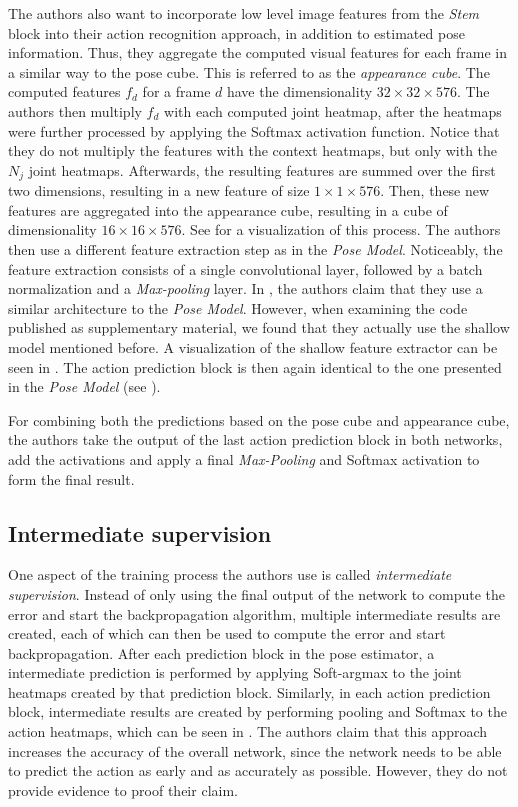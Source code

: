 The authors also want to incorporate low level image features from the \textit{Stem} block into their action recognition approach, in addition to estimated pose information.
Thus, they aggregate the computed visual features for each frame in a similar way to the pose cube.
This is referred to as the \textit{appearance cube}.
The computed features $f_d$ for a frame $d$ have the dimensionality $32 \times 32 \times 576$.
The authors then multiply $f_d$ with each computed joint heatmap, after the heatmaps were further processed by applying the Softmax activation function.
Notice that they do not multiply the features with the context heatmaps, but only with the $N_j$ joint heatmaps.
Afterwards, the resulting features are summed over the first two dimensions, resulting in a new feature of size $1 \times 1 \times 576$.
Then, these new features are aggregated into the appearance cube, resulting in a cube of dimensionality $16 \times 16 \times 576$.
See  for a visualization of this process.
The authors then use a different feature extraction step as in the \textit{Pose Model}.
Noticeably, the feature extraction consists of a single convolutional layer, followed by a batch normalization and a \textit{Max-pooling} layer.
In \cite{luvizon_2d/3d_2018}, the authors claim that they use a similar architecture to the \textit{Pose Model}.
However, when examining the code published as supplementary material, we found that they actually use the shallow model mentioned before.
A visualization of the shallow feature extractor can be seen in .
The action prediction block is then again identical to the one presented in the \textit{Pose Model} (see ).

For combining both the predictions based on the pose cube and appearance cube, the authors take the output of the last action prediction block in both networks, add the activations and apply a final \textit{Max-Pooling} and Softmax activation to form the final result. 

\subsection{Intermediate supervision}
\label{sec:luvizon_intermediate_supervision}
One aspect of the training process the authors use is called \textit{intermediate supervision}.
Instead of only using the final output of the network to compute the error and start the backpropagation algorithm, multiple intermediate results are created, each of which can then be used to compute the error and start backpropagation.
After each prediction block in the pose estimator, a intermediate prediction is performed by applying Soft-argmax to the joint heatmaps created by that prediction block.
Similarly, in each action prediction block, intermediate results are created by performing pooling and Softmax to the action heatmaps, which can be seen in .
The authors claim that this approach increases the accuracy of the overall network, since the network needs to be able to predict the action as early and as accurately as possible.
However, they do not provide evidence to proof their claim.  

